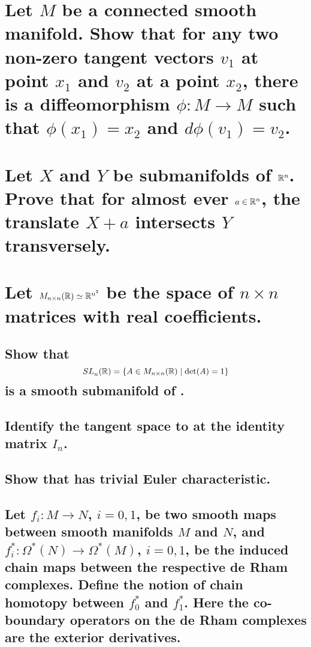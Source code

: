 \documentclass[10pt]{article}
\begin{document}
 

\section{Let $M$ be a connected smooth manifold. Show that for any two non-zero tangent vectors
  $v_1$ at point $x_1$ and $v_2$ at a point $x_2$, there is a diffeomorphism $\phi : M \to M$ such
  that $\phi(x_1) = x_2$ and $d\phi(v_1) = v_2$.}

\section{Let $X$ and $Y$ be submanifolds of $\mathbb{R}^n$. Prove that for almost ever $a \in \mathbb{R}^n$, the
  translate $X + a$ intersects $Y$ transversely.}

\section{Let $M_{n \times n}(\mathbb{R}) \simeq \mathbb{R}^{n^2}$ be the space of $n \times n$ matrices with real
  coefficients.}
\subsection{Show that $$ SL^{}_{n}(\mathbb{R}) = \{ A \in M_{n \times n}(\mathbb{R}) \mid \det(A) = 1 \}$$ is a smooth
  submanifold of .}
\subsection{Identify the tangent space to  at the identity matrix $I_n$.}
\subsection{Show that  has trivial Euler characteristic.}

\advsection
\subsection{Let $f_i : M \to N$, $i = 0,1$, be two smooth maps between smooth manifolds $M$ and $N$,
  and $f_i^* : \Omega^*(N) \to \Omega^*(M)$, $i = 0,1$, be the induced chain maps between the
  respective de Rham complexes. Define the notion of chain homotopy between $f_0^*$ and
  $f_1^*$. Here the co-boundary operators on the de Rham complexes are the exterior derivatives.}
\end{document}
